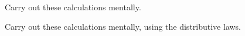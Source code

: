 \begin{exercises}
    \begin{questions}
        \Question[9] Carry out these calculations mentally.
        \begin{multicols}{2}
        \end{multicols}
        \Question[6] Carry out these calculations mentally, using the distributive laws.
\end{questions}
\end{exercises}
